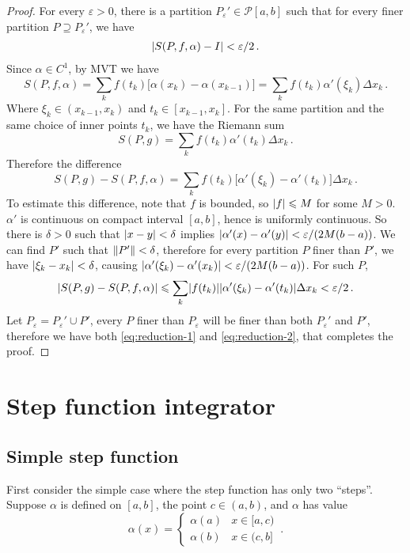 \documentclass{article}
\newcommand{\Partition}{\mathcal P}
\DeclarePairedDelimiter\abs{\lvert}{\rvert}
\DeclarePairedDelimiter\norm{\lVert}{\rVert}
\newcommand{\finer}{\supseteq}
\begin{document}
\begin{proof}
    For every $ \varepsilon > 0 $, there is a partition $ P_\varepsilon' \in \Partition[a, b] $ such that for every finer partition $ P \finer P_\varepsilon' $, we have
    \begin{align} \label{eq:reduction-1}
        \abs{ S(P, f, \alpha) - I } < \varepsilon / 2 \,.
    \end{align}
    Since $ \alpha \in C^1 $, by MVT we have
    \[ 
        S(P, f, \alpha) = \sum_{k} f(t_k) \big[ \alpha(x_k) - \alpha(x_{k-1}) \big] = \sum_{k} f(t_k) \alpha'(\xi_k) \Delta x_k \,.
    \]
    Where $ \xi_k \in (x_{k-1}, x_k) $ and $ t_k \in [x_{k-1}, x_k] $. For the same partition and the same choice of inner points $ t_k $, we have the Riemann sum
    \[ 
        S(P, g) = \sum_{k} f(t_k) \alpha'(t_k) \Delta x_k \,.
    \]
    Therefore the difference
    \[ 
        S(P, g) - S(P, f, \alpha) = \sum_{k} f(t_k) \big[ \alpha'(\xi_k) - \alpha'(t_k) \big] \Delta x_k \,.
    \]
    To estimate this difference, note that $ f $ is bounded, so $ \abs{ f } \leqslant M $ for some $ M > 0 $. $ \alpha' $ is continuous on compact interval $ [a, b] $, hence is uniformly continuous. So there is $ \delta > 0 $ such that $ \abs{ x - y } < \delta $ implies $ \abs{ \alpha'(x) - \alpha'(y) } < \varepsilon / (2 M (b - a)) $. We can find $ P' $ such that $ \norm{ P' } < \delta $, therefore for every partition $ P $ finer than $ P' $, we have $ \abs{ \xi_k - x_k } < \delta $, causing $ \abs{ \alpha'(\xi_k) - \alpha'(x_k) } < \varepsilon / (2 M (b - a)) $. For such $ P $,
    \begin{align} \label{eq:reduction-2}
        \abs{ S(P, g) - S(P, f, \alpha) } \leqslant \sum_{k} \abs{ f(t_k) } \abs{ \alpha'(\xi_k) - \alpha'(t_k) } \Delta x_k < \varepsilon / 2 \,.
    \end{align}
    Let $ P_\varepsilon = P_\varepsilon' \cup P' $, every $ P $ finer than $ P_\varepsilon $ will be finer than both $ P_\varepsilon' $ and $ P' $, therefore we have both \eqref{eq:reduction-1} and \eqref{eq:reduction-2}, that completes the proof.
\end{proof}

\section{Step function integrator}
\subsection{Simple step function}
First consider the simple case where the step function has only two ``steps''.  Suppose $ \alpha $ is defined on $ [a, b] $, the point $ c \in (a, b) $, and $ \alpha $ has value
\[ 
    \alpha(x) =
    \begin{cases}
        \alpha(a) & x \in [a, c) \\
        \alpha(b) & x \in (c, b]
    \end{cases} \,.
\]
\end{document}
